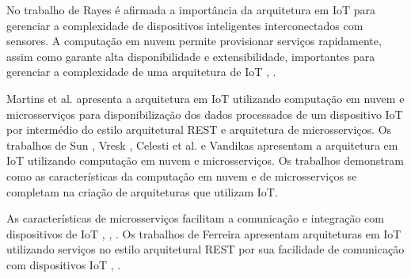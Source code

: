 

No trabalho de Rayes \cite{Rayes2017} é afirmada a importância da arquitetura em \acrshort{IoT} para gerenciar a complexidade de dispositivos inteligentes interconectados com sensores. A computação em nuvem permite provisionar serviços rapidamente, assim como garante alta disponibilidade e extensibilidade, importantes para gerenciar a complexidade de uma arquitetura de \acrshort{IoT} \cite{Sun2017}, \cite{Botta2014}. 

Martins et al. \cite{Martins2017} apresenta a arquitetura em \acrshort{IoT} utilizando computação em nuvem e microsserviços para disponibilização dos dados processados de um dispositivo \acrshort{IoT} por intermédio do estilo arquitetural \acrshort{REST} e arquitetura de microsserviços. Os trabalhos de Sun \cite{Sun2017}, Vresk \cite{Vresk2016}, Celesti et al. \cite{Celesti2017} e Vandikas \cite{Vandikas2017} apresentam a arquitetura em \acrshort{IoT} utilizando computação em nuvem e microsserviços. Os trabalhos demonstram como as características da computação em nuvem e de microsserviços se completam na criação de arquiteturas que utilizam \acrshort{IoT}. 

As características de microsserviços facilitam a comunicação e integração com dispositivos de \acrshort{IoT} \cite{Dragoni2016}, \cite{Lewis2014}, \cite{Richardson2016}. Os trabalhos de Ferreira apresentam arquiteturas em \acrshort{IoT} utilizando serviços no estilo arquitetural \acrshort{REST} por sua facilidade de comunicação com dispositivos \acrshort{IoT} \cite{Ferreira2013IoTArduino}, \cite{Ferreira2014AAPIs}.

